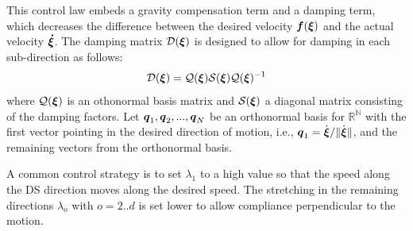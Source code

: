 This control law embeds a gravity compensation term and a damping term, which decreases the difference between the desired velocity $\boldsymbol{f}(\boldsymbol{\xi})$ and the actual velocity $\boldsymbol{\dot\xi}$.
The damping matrix $\mathcal{D}(\boldsymbol{\xi})$ is designed to allow for damping in each sub-direction as follows:
\begin{equation}
  \matd {D}(\vecs \xi) = \matd{Q}(\vecs\xi)\matd{S}(\vecs\xi) \matd{Q} (\vecs \xi)^{-1}
\label{D_matrix_shaping}
\end{equation}
where $\mathcal{Q}(\boldsymbol{\xi})$ is an othonormal basis matrix and $\mathcal{S}(\boldsymbol{\xi})$ a diagonal matrix consisting of the damping factors. Let $\boldsymbol{q}_1, \boldsymbol{q}_2, ..., \boldsymbol{q}_N$ be an orthonormal basis for $\mathbb{R^N}$ with the first vector pointing in the desired direction of motion, i.e., $\boldsymbol{q}_1 = \dot{\boldsymbol{\xi}} / \lVert \dot{\boldsymbol{\xi}} \rVert$, and the remaining vectors from the orthonormal basis.

A common control strategy is to set $\lambda_1$ to a high value so that the speed along the DS direction moves along the desired speed. The stretching in the remaining directions $\lambda_o$ with $o = 2 .. d$ is set lower to allow compliance perpendicular to the motion. 

